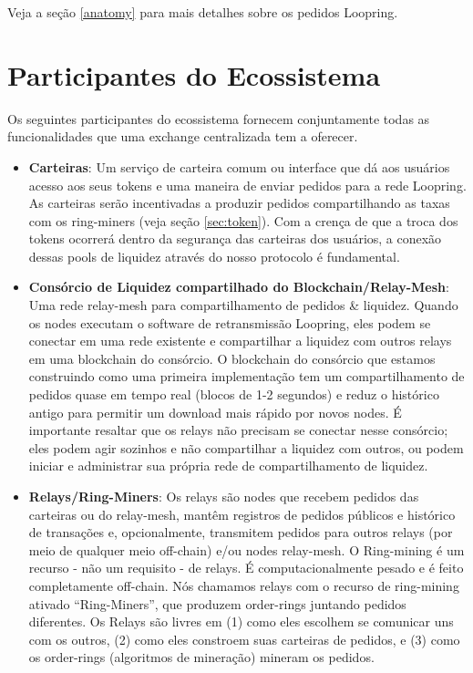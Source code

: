 \documentclass[UTF8,nofonts]{article}
\begin{document}
\begin{multicols}{2}
Veja a seção \ref{anatomy} para mais detalhes sobre os pedidos Loopring.



\section{Participantes do Ecossistema\label{sec:ecosystem}}
Os seguintes participantes do ecossistema fornecem conjuntamente todas as funcionalidades que uma exchange centralizada tem a oferecer.

\begin{itemize}

\item \textbf{Carteiras}: Um serviço de carteira comum ou interface que dá aos usuários acesso aos seus tokens e uma maneira de enviar pedidos para a rede Loopring. As carteiras serão incentivadas a produzir pedidos compartilhando as taxas com os ring-miners (veja seção \ref{sec:token}). Com a crença de que a troca dos tokens ocorrerá dentro da segurança das carteiras dos usuários, a conexão dessas pools de liquidez através do nosso protocolo é fundamental.

\item \textbf{Consórcio de Liquidez compartilhado do Blockchain/Relay-Mesh}: Uma rede relay-mesh para compartilhamento de pedidos \& liquidez. Quando os nodes executam o software de retransmissão Loopring, eles podem se conectar em uma rede existente e compartilhar a liquidez com outros relays em uma blockchain do consórcio. O blockchain do consórcio que estamos construindo como uma primeira implementação tem um compartilhamento de pedidos quase em tempo real (blocos de 1-2 segundos) e reduz o histórico antigo para permitir um download mais rápido por novos nodes. É importante resaltar que os relays  não precisam se conectar nesse consórcio; eles podem agir sozinhos e não compartilhar a liquidez com outros, ou podem iniciar e administrar sua própria rede de compartilhamento de liquidez.

\item \textbf{Relays/Ring-Miners}: Os relays são nodes que recebem pedidos das carteiras ou do relay-mesh, mantêm registros de pedidos públicos e histórico de transações e, opcionalmente, transmitem pedidos para outros relays (por meio de qualquer meio off-chain) e/ou nodes relay-mesh. O Ring-mining é um recurso - não um requisito - de relays. É computacionalmente pesado e é feito completamente off-chain. Nós chamamos relays com o recurso de ring-mining ativado \enquote{Ring-Miners}, que produzem order-rings juntando pedidos diferentes. Os Relays são livres em (1) como eles escolhem se comunicar uns com os outros, (2) como eles constroem suas carteiras de pedidos, e (3) como os order-rings (algoritmos de mineração) mineram os pedidos.


\end{itemize}
\end{multicols}
\end{document}
